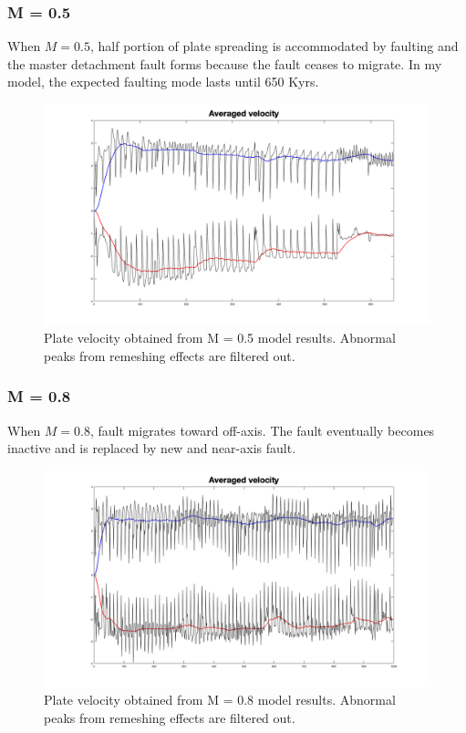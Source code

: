 \documentclass[letterpaper,12pt,notitle]{memphisthesis}                     %
\begin{document}
\subsubsection{M = 0.5}

When $M=0.5$, half portion of plate spreading is accommodated by faulting and the master detachment fault forms because the fault ceases to migrate.
In my model, the expected faulting mode lasts until 650 Kyrs.


\begin{figure}[!htb]
	\centering
	\includegraphics[width=0.99\linewidth]{./figs/m05vel.png}
	\caption{Plate velocity obtained from M = 0.5 model results. Abnormal peaks from remeshing effects are filtered out.}
	\label{fig:m05vel}
\end{figure}

\subsubsection{M = 0.8}

When $M=0.8$, fault migrates toward off-axis. The fault eventually becomes inactive and is replaced by new and near-axis fault.

\begin{figure}[!htb]
	\centering
	\includegraphics[width=0.99\linewidth]{./figs/m08vel.png}
	\caption{Plate velocity obtained from M = 0.8 model results. Abnormal peaks from remeshing effects are filtered out.}
	\label{fig:m08vel}
\end{figure}
\end{document}

